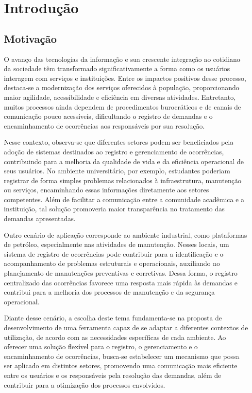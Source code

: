\documentclass[12pt,a4paper]{article}
\begin{document}
\tableofcontents
\clearpage

\setcounter{page}{4} 

\section{Introdução}
\subsection{Motivação}
O avanço das tecnologias da informação e sua crescente integração ao cotidiano da sociedade têm transformado significativamente a forma como os usuários interagem com serviços e instituições. Entre os impactos positivos desse processo, destaca-se a modernização dos serviços oferecidos à população, proporcionando maior agilidade, acessibilidade e eficiência em diversas atividades. Entretanto, muitos processos ainda dependem de procedimentos burocráticos e de canais de comunicação pouco acessíveis, dificultando o registro de demandas e o encaminhamento de ocorrências aos responsáveis por sua resolução.

Nesse contexto, observa-se que diferentes setores podem ser beneficiados pela adoção de sistemas destinados ao registro e gerenciamento de ocorrências, contribuindo para a melhoria da qualidade de vida e da eficiência operacional de seus usuários. No ambiente universitário, por exemplo, estudantes poderiam registrar de forma simples problemas relacionados à infraestrutura, manutenção ou serviços, encaminhando essas informações diretamente aos setores competentes. Além de facilitar a comunicação entre a comunidade acadêmica e a instituição, tal solução promoveria maior transparência no tratamento das demandas apresentadas.

Outro cenário de aplicação corresponde ao ambiente industrial, como plataformas de petróleo, especialmente nas atividades de manutenção. Nesses locais, um sistema de registro de ocorrências pode contribuir para a identificação e o acompanhamento de problemas estruturais e operacionais, auxiliando no planejamento de manutenções preventivas e corretivas. Dessa forma, o registro centralizado das ocorrências favorece uma resposta mais rápida às demandas e contribui para a melhoria dos processos de manutenção e da segurança operacional.

Diante desse cenário, a escolha deste tema fundamenta-se na proposta de desenvolvimento de uma ferramenta capaz de se adaptar a diferentes contextos de utilização, de acordo com as necessidades específicas de cada ambiente. Ao oferecer uma solução flexível para o registro, o gerenciamento e o encaminhamento de ocorrências, busca-se estabelecer um mecanismo que possa ser aplicado em distintos setores, promovendo uma comunicação mais eficiente entre os usuários e os responsáveis pela resolução das demandas, além de contribuir para a otimização dos processos envolvidos.
\end{document}
